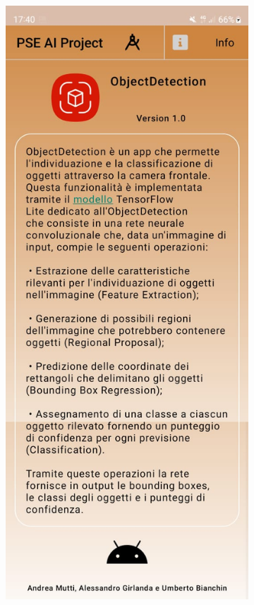 \begin{figure}[H]
  \centering
  \begin{subfigure}[b]{0.3\textwidth}
    \includegraphics[width=\textwidth, height=0.45\textheight]{Immagini/App/info_chiaro.jpeg}

\end{subfigure}
\end{figure}

